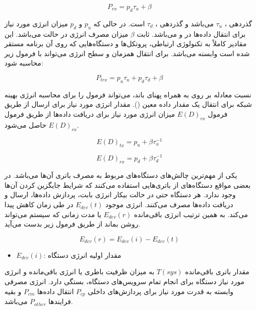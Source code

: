\documentclass[a4paper]{article}
\begin{document}
\begin{equation}
    P_{rx} = p_d \tau_{u} + \beta
\end{equation}

گذردهی ، $\tau_u$ می‌باشد و گذردهی ، $\tau_d$ است. در
حالی که $p_u$ و $p_d$ میزان انرژی مورد نیاز برای انتقال داده‌ها در  و
 می‌باشد. ثابت $\beta$ میزان مصرف انرژی در حالت  می‌باشد.
این مقادیر کاملاً به تکنولوژی ارتباطی، پروتکل‌ها و دستگاه‌هایی که روی آن برنامه
مستقر شده است وابسته می‌‌باشد. برای انتقال همزمان  و 
سطح انرژی می‌تواند با فرمول زیر محاسبه شود:

\begin{equation}
    P_{trx} = p_u\tau_u + p_d\tau_d + \beta
\end{equation}

نسبت معادله  بر روی  به همراه پهنای باند، می‌تواند فرمول
را برای محاسبه انرژی بهینه شبکه برای انتقال یک مقدار داده معین (). مقدار انرژی مورد نیاز برای ارسال از طریق فرمول $E(D)_{rx}$ میزان انرژی
مورد نیاز برای دریافت داده‌ها از طریق فرمول $E(D)_{rx}$ حاصل می‌شود.

\begin{equation}
    E(D)_{tx} = p_u + \beta\tau^{-1}_u
\end{equation}

\begin{equation}
    E(D)_{rx} = p_d + \beta\tau^{-1}_d
\end{equation}

یکی از مهم‌ترین چالش‌های دستگاه‌های  مربوط به مصرف باتری آن‌ها می‌باشد.
در بعضی مواقع دستگاه‌های  از باتری‌هایی استفاده می‌کنند که شرایط جایگزین
کردن آن‌ها وجود ندارد. هر دستگاه  حتی در حالت بیکار انرژی بابت، پردازش
داده‌ها، ارسال و دریافت داده‌ها مصرف می‌کنند. انرژی موجود $E_{dev}(t)$ در طی
زمان کاهش پیدا می‌کند. به همین ترتیب انرژی باقی‌مانده $E_{dev}(r)$ یا مدت زمانی
که سیستم می‌تواند روشن بماند از طریق فرمول زیر بدست می‌آید.

\begin{equation}
    E_{dev}(r) = E_{dev}(i) - E_{dev}(t)
\end{equation}

\begin{itemize}
    \item $E_{dev}(i)$: مقدار اولیه انرژی دستگاه
\end{itemize}

مقدار باتری باقی‌مانده $T(sys)$ به میزان ظرفیت باطری یا انرژی باقی‌مانده و انرژی
مورد نیاز دستگاه برای انجام تمام سرویس‌های دستگاه، بستگی دارد. انرژی مصرفی
وابسته به قدرت مورد نیاز برای پردازش‌های داخلی $P_{cp}$ انتقال داده‌ها $P_{cm}$
و بقیه فرایند‌ها $P_{other}$ می‌باشد.
\end{document}
